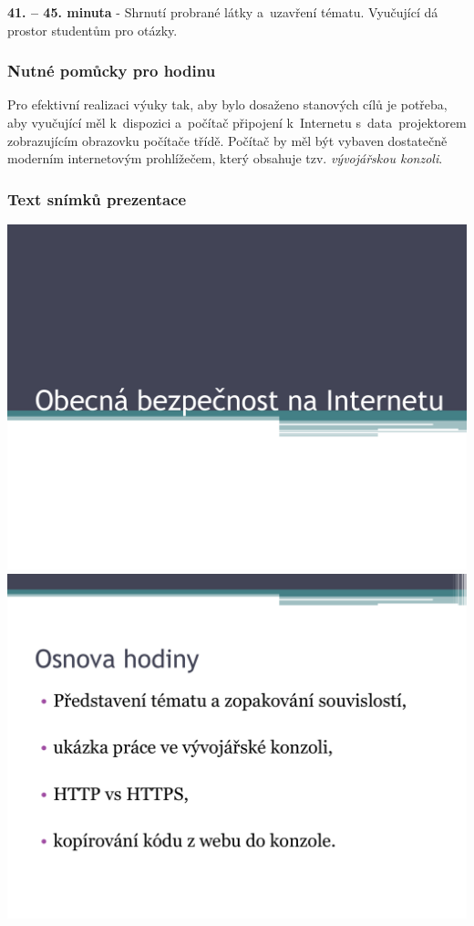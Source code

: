 \documentclass[a4paper, 12pt]{article}
\begin{document}
\textbf{41. -- 45. minuta} - Shrnutí probrané látky a~uzavření tématu. Vyučující dá prostor studentům pro otázky.

\subsubsection{Nutné pomůcky pro hodinu}
Pro efektivní realizaci výuky tak, aby bylo dosaženo stanových cílů je potřeba, aby vyučující měl k~dispozici a~počítač připojení k~Internetu s~data~projektorem zobrazujícím obrazovku počítače třídě. Počítač by měl být vybaven dostatečně moderním internetovým prohlížečem, který obsahuje tzv. \textit{vývojářskou konzoli}.

\subsubsection{Text snímků prezentace}
\includegraphics[scale=0.5]{GeneralSecuritySlides/p01.pdf} \\
\vspace{0.5in}
\includegraphics[scale=0.5]{GeneralSecuritySlides/p02.pdf} \\
\end{document}
